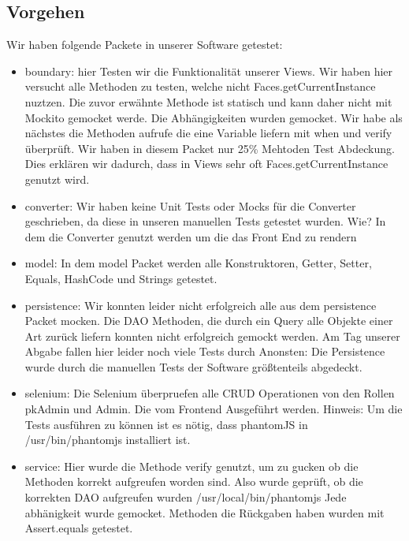 \documentclass[enabledeprecatedfontcommands,fontsize=12pt,paper=a4,twoside]{scrartcl}
\begin{document}
\subsection{Vorgehen}

Wir haben folgende Packete in unserer Software getestet:
\begin{itemize}
  \item boundary: hier Testen wir die Funktionalität unserer Views. Wir haben
  hier versucht alle Methoden zu testen, welche nicht Faces.getCurrentInstance
  nuztzen. Die zuvor erwähnte Methode ist statisch und kann daher nicht mit
  Mockito gemocket werde. Die Abhängigkeiten wurden gemocket. Wir habe als
  nächstes die Methoden aufrufe die eine Variable liefern mit when und verify
  überprüft.
  Wir haben in diesem Packet nur 25\% Mehtoden Test Abdeckung. Dies erklären wir
  dadurch, dass in Views sehr oft Faces.getCurrentInstance genutzt wird.

  \item converter: Wir haben keine Unit Tests oder Mocks für die Converter
  geschrieben, da diese in unseren manuellen Tests getestet wurden. Wie? In dem
  die Converter genutzt werden um die das Front End zu rendern

  \item model: In dem model Packet werden alle Konstruktoren, Getter, Setter, Equals, HashCode
  und Strings getestet.

  \item persistence: Wir konnten leider nicht erfolgreich alle aus dem
  persistence Packet mocken. Die DAO Methoden, die durch ein Query alle Objekte
  einer Art zurück liefern konnten nicht erfolgreich gemockt werden. Am Tag
  unserer Abgabe fallen hier leider noch viele Tests durch
  Anonsten: Die Persistence wurde durch die manuellen Tests der Software größtenteils abgedeckt.

  \item selenium: Die Selenium überpruefen alle CRUD Operationen von den Rollen pkAdmin
  und Admin. Die vom Frontend Ausgeführt werden. Hinweis: Um die Tests ausführen
  zu können ist es nötig, dass phantomJS in /usr/bin/phantomjs installiert ist.

  \item service: Hier wurde die Methode verify genutzt, um zu gucken ob die
  Methoden korrekt aufgreufen worden sind. Also wurde geprüft, ob die korrekten
  DAO aufgreufen wurden /usr/local/bin/phantomjs
  Jede abhänigkeit wurde gemocket. Methoden die Rückgaben haben wurden mit
  Assert.equals getestet.
  \end{itemize}
\end{document}
